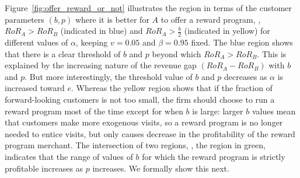 Figure~\ref{fig:offer_reward_or_not} illustrates the region in terms of the customer parameters $(b,p)$ where it is better for $A$ to offer a reward program, \ie, $RoR_A > RoR_B$ (indicated in blue) and $RoR_A > \frac{b}{2}$ (indicated in yellow) for different values of $\alpha$, keeping $v = 0.05$ and $\beta = 0.95$ fixed.
The blue region shows that there is a clear threshold of $b$ and $p$ beyond which $RoR_A > RoR_B$.
This is explained by the increasing nature of the revenue gap $(RoR_A - RoR_B)$ with $b$ and $p$.
But more interestingly, the threshold value of $b$ and $p$ decreases as $\alpha$ is increased toward $e$.
Whereas the yellow region shows that if the fraction of forward-looking customers is not too small, the firm should choose to run a reward program most of the time except for when $b$ is large: larger $b$ values mean that customers make more exogenous visits, so a reward program is no longer needed to entice visits, but only causes decrease in the profitability of the reward program merchant.
The intersection of two regions, \ie, the region in green, indicates that the range of values of $b$ for which the reward program is strictly profitable increases as $p$ increases.
We formally show this next.

